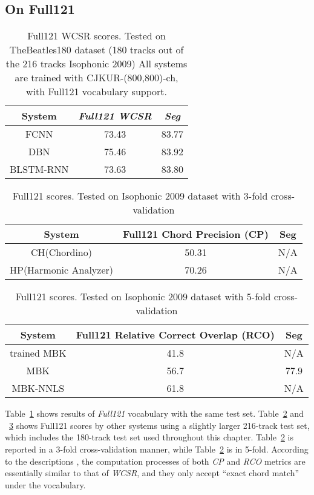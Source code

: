 \subsection{On Full121}

\begin{table}[h]
\footnotesize
\centering
\caption{Full121 WCSR scores. Tested on TheBeatles180 dataset (180 tracks out of the 216 tracks Isophonic 2009) All systems are trained with CJKUR-(800,800)-ch, with Full121 vocabulary support.}
\label{tab:3-full}
\begin{tabular}{|c|c|c|}\hline
System & \textit{Full121} \textit{WCSR} & \textit{Seg} \\ \hline
FCNN & 73.43 & 83.77 \\ \hline
DBN & 75.46 & 83.92 \\ \hline
BLSTM-RNN & 73.63 & 83.80 \\ \hline
\end{tabular}
\end{table}

\begin{table}[h]
\footnotesize
\centering
\caption{Full121 scores. Tested on Isophonic 2009 dataset with 3-fold cross-validation\cite{ni2012end}}
\label{tab:3-fullhp}
\begin{tabular}{|c|c|c|}\hline
System & Full121 Chord Precision (CP) & Seg \\ \hline
CH(Chordino) & 50.31 & N/A \\ \hline
HP(Harmonic Analyzer) & 70.26 & N/A\\ \hline
\end{tabular}
\end{table}

\begin{table}[h]
\footnotesize
\centering
\caption{Full121 scores. Tested on Isophonic 2009 dataset with 5-fold cross-validation \cite{mauch2010automatic}}
\label{tab:3-fullmbk}
\begin{tabular}{|c|c|c|}\hline
System & Full121 Relative Correct Overlap (RCO) & Seg \\ \hline
trained MBK & 41.8 & N/A \\ \hline
MBK & 56.7 & 77.9 \\ \hline
MBK-NNLS & 61.8 & N/A \\ \hline
\end{tabular}
\end{table}

Table~\ref{tab:3-full} shows results of \textit{Full121} vocabulary with the same test set. Table~\ref{tab:3-fullhp} and ~\ref{tab:3-fullmbk} shows Full121 scores by other systems using a slightly larger 216-track test set, which includes the 180-track test set used throughout this chapter. Table~\ref{tab:3-fullhp} is reported in a 3-fold cross-validation manner, while Table~\ref{tab:3-fullhp} is in 5-fold. According to the descriptions \cite{ni2012end,mauch2010automatic}, the computation processes of both \textit{CP} and \textit{RCO} metrics are essentially similar to that of \textit{WCSR}, and they only accept ``exact chord match'' under the vocabulary.

